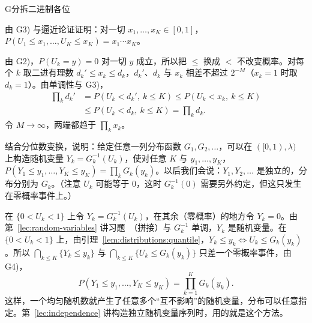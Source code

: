 \begin{probleme}{G}{分拆二进制各位}
\begin{questions}
\begin{solution}
\end{solution}
\item 由 G3) 与逼近论证证明：对一切 $x_1,\dots,x_K\in[0,1]$，$P(U_1\leqslant x_1,\dots,U_K\leqslant x_K)=x_1\cdots x_K$。
\begin{solution}
由 G2)，$P(U_k=y)=0$ 对一切 $y$ 成立，所以把 $\leqslant$ 换成 $<$ 不改变概率。对每个 $k$ 取二进有理数 $d_k'\leqslant x_k\leqslant d_k$，$d_k'$、$d_k$ 与 $x_k$ 相差不超过 $2^{-M}$（$x_k=1$ 时取 $d_k=1$）。由单调性与 G3)，
\[
\begin{aligned}
\prod_kd_k'&=P(U_k<d_k',\ k\leqslant K)\leqslant P(U_k<x_k,\ k\leqslant K)\\
&\leqslant P(U_k<d_k,\ k\leqslant K)=\prod_kd_k .
\end{aligned}
\]
令 $M\to\infty$，两端都趋于 $\prod_kx_k$。
\end{solution}
\item 结合分位数变换，说明：给定任意一列分布函数 $G_1,G_2,\dots$，可以在 $([0,1),\lambda)$ 上构造随机变量 $Y_k=G_k^{-1}(U_k)$，使对任意 $K$ 与 $y_1,\dots,y_K$，$P(Y_1\leqslant y_1,\dots,Y_K\leqslant y_K)=\prod_kG_k(y_k)$。以后我们会说：$Y_1,Y_2,\dots$ 是独立的，分布分别为 $G_k$。（注意 $U_k$ 可能等于 $0$，这时 $G_k^{-1}(0)$ 需要另外约定，但这只发生在零概率事件上。）
\begin{solution}
在 $\{0<U_k<1\}$ 上令 $Y_k=G_k^{-1}(U_k)$，在其余（零概率）的地方令 $Y_k=0$。由第~\ref{lec:random-variables} 讲习题~（拼接）与 $G_k^{-1}$ 单调，$Y_k$ 是随机变量。在 $\{0<U_k<1\}$ 上，由引理~\ref{lem:distributions:quantile}，$Y_k\leqslant y_k\iff U_k\leqslant G_k(y_k)$。所以 $\bigcap_{k\leqslant K}\{Y_k\leqslant y_k\}$ 与 $\bigcap_{k\leqslant K}\{U_k\leqslant G_k(y_k)\}$ 只差一个零概率事件，由 G4)，
\[
P(Y_1\leqslant y_1,\dots,Y_K\leqslant y_K)=\prod_{k=1}^KG_k(y_k).
\]
这样，一个均匀随机数就产生了任意多个“互不影响”的随机变量，分布可以任意指定。第~\ref{lec:independence} 讲构造独立随机变量序列时，用的就是这个方法。
\end{solution}
\end{questions}
\end{probleme}
